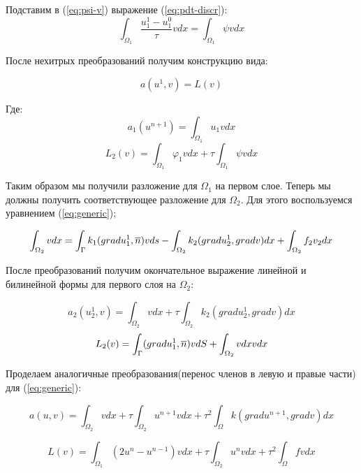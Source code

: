 Подставим в (\ref{eq:psi-v}) выражение (\ref{eq:pdt-discr}):
$$\int_{\Omega_1} \frac{u_1^1-u_1^0}{\tau}vdx = \int_{\Omega_1}\psi vdx $$

После нехитрых преобразований получим конструкцию вида:

\begin{equation}
     a(u^{1}, v) = L(v) 
     \label{eq:al-first-layer}
\end{equation}


Где:
$$ a_1(u^{n + 1}) = \int_{\Omega_1}u_1vdx $$
$$ L_2(v) = \int_{\Omega_1}\varphi_1 vdx + \tau\int_{\Omega_1}\psi vdx $$


Таким образом мы получили разложение для $\Omega_1$ на первом слое. Теперь мы должны получить соответствующее разложение для $\Omega_2$. Для этого воспользуемся уравнением (\ref{eq:generic});

$$ \int_{\Omega_2}vdx = \int_{\Gamma}k_1(gradu_1^1, \overline{n})vds - \int_{\Omega_2}k_2(gradu_2^1, gradv)dx + \int_{\Omega_2}f_2v_2dx $$

После преобразований получим окончательное выражение линейной и билинейной формы для первого слоя на $\Omega_2$:

$$ a_2(u_2^1, v) = \int_{\Omega_2}vdx + \tau\int_{\Omega_2}^{}k_2(gradu_2^1, gradv)dx $$
$$ L_2(v) = \int_{\Gamma}(gradu_1^1, \overline{n})vdS + \int_{\Omega_2}^{}vdx vdx$$

Проделаем аналогичные преобразования(перенос членов в левую и правые части) для (\ref{eq:generic}):

\begin{equation}
    a(u, v) = \int_{\Omega_2}^{}vdx + \tau\int_{\Omega_2}^{}u^{n+1}vdx + \tau^2\int_{\Omega}^{}k(gradu^{n+1}, gradv)dx
    \label{eq:a-variational-generic}
\end{equation}

\begin{equation}
    L(v) = \int_{\Omega_1}^{}(2u^n - u^{n-1})vdx + \tau\int_{\Omega_2}^{}u^nvdx + \tau^2\int_{\Omega}^{}fvdx   
    \label{}
\end{equation}
